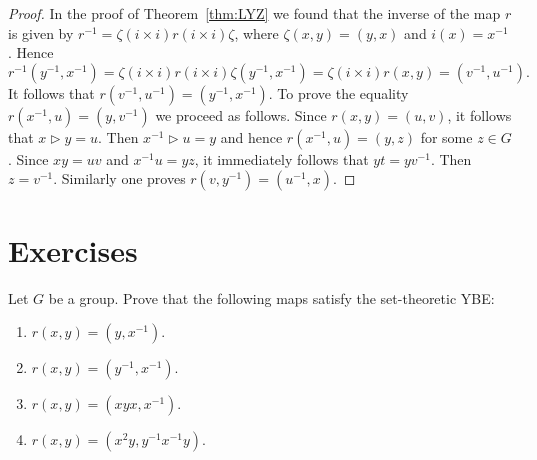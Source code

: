 \begin{proof}
In the proof of Theorem~\ref{thm:LYZ} we found that 
the inverse of the map $r$ is given by $r^{-1}=\zeta (i\times i) r (i\times i) \zeta$,
where $\zeta(x,y)=(y,x)$ and $i(x)=x^{-1}$. Hence 
\[
r^{-1}(y^{-1},x^{-1})=\zeta (i\times i) r (i\times i) \zeta(y^{-1},x^{-1})=\zeta (i\times i) r (x,y)=(v^{-1},u^{-1}).
\]
It follows that $r(v^{-1},u^{-1})=(y^{-1},x^{-1})$.  
To prove the equality $r(x^{-1},u)=(y,v^{-1})$ we proceed as follows. Since $r(x,y)=(u,v)$, it 
follows that $x\triangleright y=u$. Then $x^{-1}\triangleright u=y$ and
hence $r(x^{-1},u)=(y,z)$ for some $z\in G$. 
Since $xy=uv$ and $x^{-1}u=yz$, it immediately follows that $yt=yv^{-1}$. Then 
$z=v^{-1}$. Similarly one proves $r(v,y^{-1})=(u^{-1},x)$.
\end{proof}
%
%

\section*{Exercises}

\begin{prob}
\label{prob:Wada}
Let $G$ be a group. Prove that the following maps satisfy the set-theoretic YBE:
\begin{enumerate}[label=\alph*)]
\item $r(x,y)=(y,x^{-1})$.
\item $r(x,y)=(y^{-1},x^{-1})$.
\item $r(x,y)=(xyx,x^{-1})$.
\item $r(x,y)=(x^2y,y^{-1}x^{-1}y)$.	
\end{enumerate}	
\end{prob}

